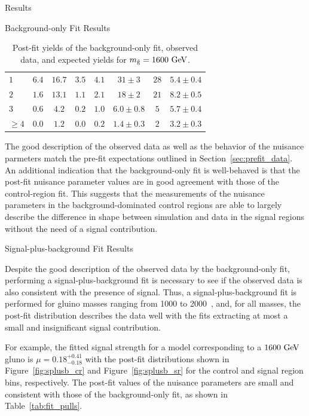 \begin{section}{Results}
\begin{subsection}{Background-only Fit Results}
\begin{table}
\begin{tabular}[tbp!]{ l | c  c  c  c | c |  c | c  }
\hline
$1$       &  $6.4$   &  $16.7$  &  $3.5$  &  $4.1$  &  $31\pm3$         &  $28$    &  $5.4 \pm 0.4$   \\
$2$       &  $1.6$   &  $13.1$  &  $1.1$  &  $2.1$  &  $18\pm2$         &  $21$    &  $8.2 \pm 0.5$   \\
$3$       &  $0.6$   &  $4.2$   &  $0.2$  &  $1.0$  &  $6.0\pm0.8$      &  $5$     &  $5.7 \pm 0.4$   \\
$\geq 4$  &  $0.0$   &  $1.2$   &  $0.0$  &  $0.2$  &  $1.4\pm0.3$      &  $2$     &  $3.2 \pm 0.3$   \\
\hline
\end{tabular}
\caption{Post-fit yields of the background-only fit, observed data, and expected yields for $m_{\tilde{\mathrm{g}}} = 1600~\mathrm{Ge\kern -0.1em V}$.}
\label{tab:bonly_yields}
\end{table}

The good description of the observed data as well as the behavior of the nuisance parmeters match the pre-fit expectations outlined in Section~\ref{sec:prefit_data}.
An additional indication that the background-only fit is well-behaved is that the post-fit nuisance parameter values are in good agreement with those of the control-region fit.
This suggests that the measurements of the nuisance parameters in the background-dominated control regions are able to largely describe the difference in \Nb shape between simulation and data in the signal regions without the need of a signal contribution.

\end{subsection}

\begin{subsection}{Signal-plus-background Fit Results}

Despite the good description of the observed data by the background-only fit, performing a signal-plus-background fit is necessary to see if the observed data is also consistent with the presence of signal. 
Thus, a signal-plus-background fit is performed for gluino masses ranging from 1000 to 2000~\GeV, and, for all masses, the post-fit \Nb distribution describes the data well with the fits extracting at most a small and insignificant signal contribution.

For example, the fitted signal strength for a model corresponding to a $1600~\mathrm{Ge\kern -0.1em V}$ gluno is $\mu = 0.18^{+0.41}_{-0.18}$ with the post-fit \Nb distributions shown in Figure~\ref{fig:splusb_cr} and Figure~\ref{fig:splusb_sr} for the control and signal region bins, respectively.
The post-fit values of the nuisance parameters are small and consistent with those of the background-only fit, as shown in Table~\ref{tab:fit_pulls}.


\end{subsection}
\end{section}

